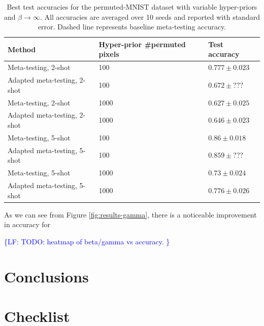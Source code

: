 \documentclass{article}
\theoremstyle{definition}
\newcommand{\LF}[1]{\textcolor{blue}{\{LF: #1\}}}
\begin{document}
\begin{table}	
	
	\centering
	\begin{tabular}{lll}
		\toprule
		Method   & Hyper-prior \#permuted pixels  & Test accuracy   \\
		\midrule
		Meta-testing, 2-shot & 100   & $0.777\pm 0.023 $      \\
		Adapted meta-testing, 2-shot & 100   & $0.672\pm ???$      \\
		\midrule
		Meta-testing, 2-shot & 1000   & $0.627\pm 0.025 $      \\
		Adapted meta-testing, 2-shot & 1000   & $0.646\pm 0.023$      \\
		\midrule
		Meta-testing, 5-shot & 100   & $0.86\pm 0.018$      \\
		Adapted meta-testing, 5-shot & 100   & $0.859\pm ???$      \\
		\midrule
		Meta-testing, 5-shot & 1000   & $0.73\pm 0.024$      \\
		Adapted meta-testing, 5-shot & 1000   & $0.776\pm 0.026$      \\
		\bottomrule
	\end{tabular}
	\caption{Best test accuracies for the permuted-MNIST dataset with variable hyper-priors and $\beta\rightarrow \infty$. All accuracies are averaged over 10 seeds and reported with standard error. Dashed line represents baseline meta-testing accuracy.}
	\label{table:gamma}
\end{table}


As we can see from Figure \ref{fig:results-gamma}, there is a noticeable improvement in accuracy for 


\LF{TODO: heatmap of beta/gamma vs accuracy. }

\section{Conclusions}


\clearpage



\section*{Checklist}
\end{document}
